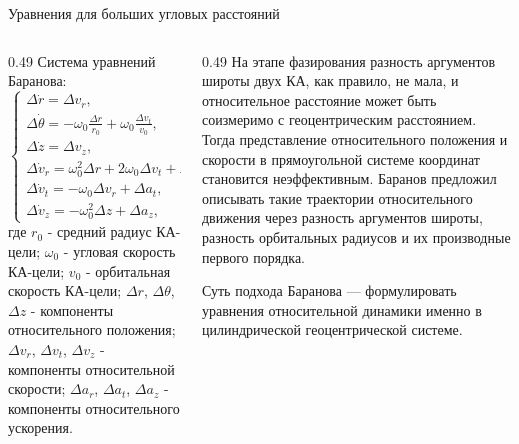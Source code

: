 \documentclass[8pt]{beamer}
\begin{document}
\begin{frame}{Уравнения для больших угловых расстояний}
\begin{columns}[T,totalwidth=\textwidth]
  \begin{column}{0.49\textwidth}
  Система уравнений Баранова:
    \begin{equation*}
        \begin{cases}
            \Delta \dot{r} = \Delta v_r, \\
            \Delta \dot{\theta} = - \omega_0 \frac{\Delta r}{r_0} + \omega_0 \frac{\Delta v_t}{v_0}, \\
            \Delta \dot{z} = \Delta v_z, \\
            \Delta \dot{v}_r = \omega_0^2 \Delta r + 2 \omega_0 \Delta v_t + \Delta a_r, \\
            \Delta \dot{v}_t = -\omega_0 \Delta v_r + \Delta a_t, \\
            \Delta \dot{v}_z = -\omega_0^2 \Delta z + \Delta a_z,
        \end{cases}
    \end{equation*}
    где $r_0$ - средний радиус КА-цели; $\omega_0$ - угловая скорость КА-цели; $v_0$ - орбитальная скорость КА-цели; $\Delta r$, $\Delta \theta$, $\Delta z$ - компоненты относительного положения; $\Delta v_r$, $\Delta v_t$, $\Delta v_z$ - компоненты относительной скорости; $\Delta a_r$, $\Delta a_t$, $\Delta a_z$ - компоненты относительного ускорения.
  \end{column}

  \begin{column}{0.49\textwidth}
    На этапе фазирования разность аргументов широты двух КА, как правило, не мала, и относительное расстояние может быть соизмеримо с геоцентрическим расстоянием. Тогда представление относительного положения и скорости в прямоугольной системе координат становится неэффективным. Баранов предложил описывать такие траектории относительного движения через разность аргументов широты, разность орбитальных радиусов и их производные первого порядка.

    Суть подхода Баранова — формулировать уравнения относительной динамики именно в цилиндрической геоцентрической системе.
  \end{column}
\end{columns}
\end{frame}
\end{document}
